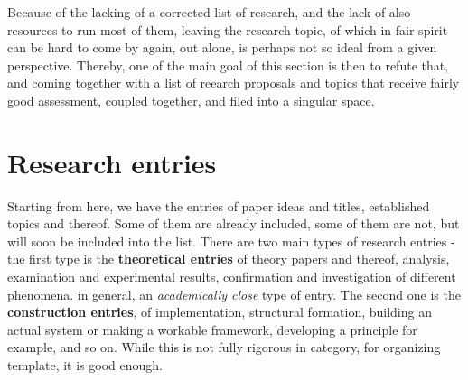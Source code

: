 Because of the lacking of a corrected list of research, and the lack of also resources to run most of them, leaving the research topic, of which in fair spirit can be hard to come by again, out alone, is perhaps not so ideal from a given perspective. Thereby, one of the main goal of this section is then to refute that, and coming together with a list of reearch proposals and topics that receive fairly good assessment, coupled together, and filed into a singular space. 

\section{Research entries}

Starting from here, we have the entries of paper ideas and titles, established topics and thereof. Some of them are already included, some of them are not, but will soon be included into the list. There are two main types of research entries - the first type is the \textbf{theoretical entries} of theory papers and thereof, analysis, examination and experimental results, confirmation and investigation of different phenomena. in general, an \textit{academically close} type of entry. The second one is the \textbf{construction entries}, of implementation, structural formation, building an actual system or making a workable framework, developing a principle for example, and so on. While this is not fully rigorous in category, for organizing template, it is good enough. 

